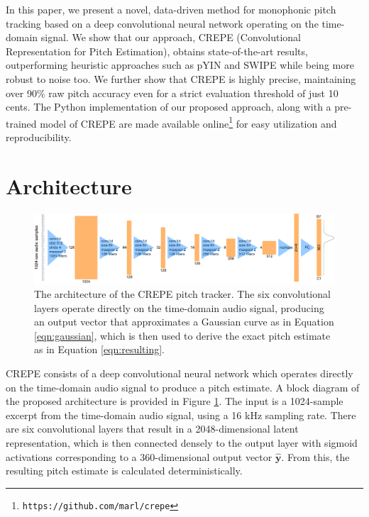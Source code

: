 In this paper, we present a novel, data-driven method for monophonic pitch tracking based on a deep convolutional neural network operating on the time-domain signal.
We show that our approach, CREPE (Convolutional  Representation  for  Pitch  Estimation), obtains state-of-the-art results, outperforming heuristic approaches such as pYIN and SWIPE while being more robust to noise too.
We further show that CREPE is highly precise, maintaining over 90\% raw pitch accuracy even for a strict evaluation threshold of just 10 cents.
The Python implementation of our proposed approach, along with a pre-trained model of CREPE are made available online\footnote{\texttt{https://github.com/marl/crepe}} for easy utilization and reproducibility.

\section{Architecture}

\setlength{\belowcaptionskip}{-5pt}
\captionsetup[figure]{skip=5pt}
\begin{figure}
	\includegraphics[width=\textwidth]{architecture.pdf}
	\caption{The architecture of the CREPE pitch tracker. The six convolutional layers operate directly on the time-domain audio signal, producing an output vector that approximates a Gaussian curve as in Equation \ref{eqn:gaussian}, which is then used to derive the exact pitch estimate as in Equation \ref{eqn:resulting}.}
	\label{fig:architecture}
\end{figure}

CREPE consists of a deep convolutional neural network which operates directly on the time-domain audio signal to produce a pitch estimate.
A block diagram of the proposed architecture is provided in Figure \ref{fig:architecture}.
The input is a 1024-sample excerpt from the time-domain audio signal, using a 16 kHz sampling rate.
There are six convolutional layers that result in a 2048-dimensional latent representation, which is then connected densely to the output layer with sigmoid activations corresponding to a 360-dimensional output vector $\hat{\mathbf{y}}$.
From this, the resulting pitch estimate is calculated deterministically.

